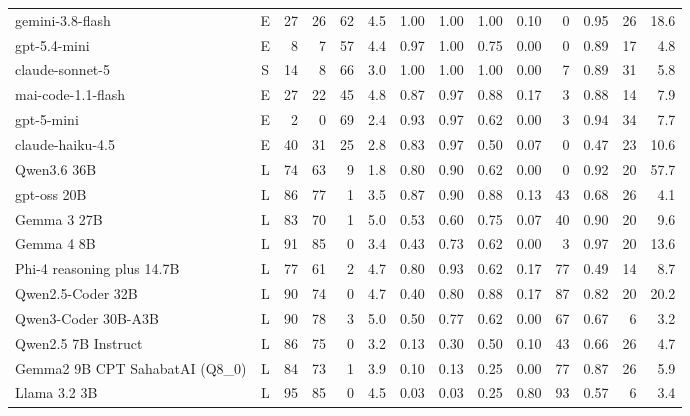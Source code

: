 \begin{table}[t]
\begin{tabular}{@{}l c r r r r r r r r r r r r@{}}
    gemini-3.8-flash & E & 27 & 26 & 62 & 4.5 & 1.00 & 1.00 & 1.00 & 0.10 & 0 & 0.95 & 26 & 18.6 \\
    gpt-5.4-mini & E & 8 & 7 & 57 & 4.4 & 0.97 & 1.00 & 0.75 & 0.00 & 0 & 0.89 & 17 & 4.8 \\
    claude-sonnet-5 & S & 14 & 8 & 66 & 3.0 & 1.00 & 1.00 & 1.00 & 0.00 & 7 & 0.89 & 31 & 5.8 \\
    mai-code-1.1-flash & E & 27 & 22 & 45 & 4.8 & 0.87 & 0.97 & 0.88 & 0.17 & 3 & 0.88 & 14 & 7.9 \\
    gpt-5-mini & E & 2 & 0 & 69 & 2.4 & 0.93 & 0.97 & 0.62 & 0.00 & 3 & 0.94 & 34 & 7.7 \\
    claude-haiku-4.5 & E & 40 & 31 & 25 & 2.8 & 0.83 & 0.97 & 0.50 & 0.07 & 0 & 0.47 & 23 & 10.6 \\
    \midrule
    Qwen3.6 36B & L & 74 & 63 & 9 & 1.8 & 0.80 & 0.90 & 0.62 & 0.00 & 0 & 0.92 & 20 & 57.7 \\
    gpt-oss 20B & L & 86 & 77 & 1 & 3.5 & 0.87 & 0.90 & 0.88 & 0.13 & 43 & 0.68 & 26 & 4.1 \\
    Gemma 3 27B & L & 83 & 70 & 1 & 5.0 & 0.53 & 0.60 & 0.75 & 0.07 & 40 & 0.90 & 20 & 9.6 \\
    Gemma 4 8B & L & 91 & 85 & 0 & 3.4 & 0.43 & 0.73 & 0.62 & 0.00 & 3 & 0.97 & 20 & 13.6 \\
    Phi-4 reasoning plus 14.7B & L & 77 & 61 & 2 & 4.7 & 0.80 & 0.93 & 0.62 & 0.17 & 77 & 0.49 & 14 & 8.7 \\
    Qwen2.5-Coder 32B & L & 90 & 74 & 0 & 4.7 & 0.40 & 0.80 & 0.88 & 0.17 & 87 & 0.82 & 20 & 20.2 \\
    Qwen3-Coder 30B-A3B & L & 90 & 78 & 3 & 5.0 & 0.50 & 0.77 & 0.62 & 0.00 & 67 & 0.67 & 6 & 3.2 \\
    Qwen2.5 7B Instruct & L & 86 & 75 & 0 & 3.2 & 0.13 & 0.30 & 0.50 & 0.10 & 43 & 0.66 & 26 & 4.7 \\
    Gemma2 9B CPT SahabatAI (Q8\_0) & L & 84 & 73 & 1 & 3.9 & 0.10 & 0.13 & 0.25 & 0.00 & 77 & 0.87 & 26 & 5.9 \\
    Llama 3.2 3B & L & 95 & 85 & 0 & 4.5 & 0.03 & 0.03 & 0.25 & 0.80 & 93 & 0.57 & 6 & 3.4 \\
    \bottomrule
  \end{tabular}
\end{table}
